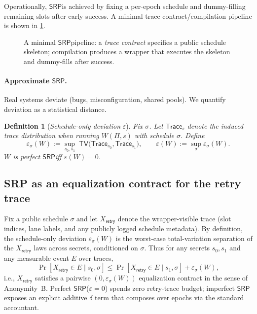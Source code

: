 \documentclass[11pt]{article}
\newtheorem{definition}{Definition}
\newcommand{\SRP}{\ensuremath{\mathsf{SRP}}}
\newcommand{\tv}{\ensuremath{\mathsf{TV}}}
\begin{document}
Operationally, \SRP is achieved by fixing a per-epoch schedule and dummy-filling remaining slots after early success.
A minimal trace-contract/compilation pipeline is shown in \cref{fig:contract}.

\begin{figure}[t]
  \centering
  \caption{A minimal \SRP pipeline: a \emph{trace contract} specifies a public schedule skeleton; compilation produces a wrapper that executes the skeleton and dummy-fills after success.}
  \label{fig:contract}
\end{figure}

\paragraph{Approximate \SRP.}
Real systems deviate (bugs, misconfiguration, shared pools). We quantify deviation as a statistical distance.

\begin{definition}[\emph{Schedule-only deviation} $\varepsilon$]
Fix $\sigma$.
Let $\mathsf{Trace}_{s}$ denote the induced trace distribution when running $W(\Pi,s)$ with schedule $\sigma$.
Define
\[\varepsilon_{\sigma}(W) := \sup_{s_0,s_1}\; \tv\big(\mathsf{Trace}_{s_0},\mathsf{Trace}_{s_1}\big),\qquad \varepsilon(W):=\sup_{\sigma}\varepsilon_{\sigma}(W).\]
$W$ is perfect \SRP iff $\varepsilon(W)=0$.
\end{definition}

\subsection*{SRP as an equalization contract for the retry trace}
Fix a public schedule $\sigma$ and let $X_{\mathsf{retry}}$ denote the wrapper-visible trace (slot indices, lane labels, and any publicly logged schedule metadata).
By definition, the schedule-only deviation $\varepsilon_{\sigma}(W)$ is the worst-case total-variation separation of the $X_{\mathsf{retry}}$ laws across secrets, conditioned on $\sigma$.
Thus for any secrets $s_0,s_1$ and any measurable event $E$ over traces,
\[
\Pr[X_{\mathsf{retry}}\in E\mid s_0,\sigma]\le \Pr[X_{\mathsf{retry}}\in E\mid s_1,\sigma]+\varepsilon_{\sigma}(W),
\]
i.e., $X_{\mathsf{retry}}$ satisfies a pairwise $(0,\varepsilon_{\sigma}(W))$ equalization contract in the sense of Anonymity~B.\cite{series:profiling}
Perfect \SRP ($\varepsilon=0$) spends zero retry-trace budget; imperfect \SRP exposes an explicit additive $\delta$ term that composes over epochs via the standard accountant.\cite{series:profiling}
\end{document}
